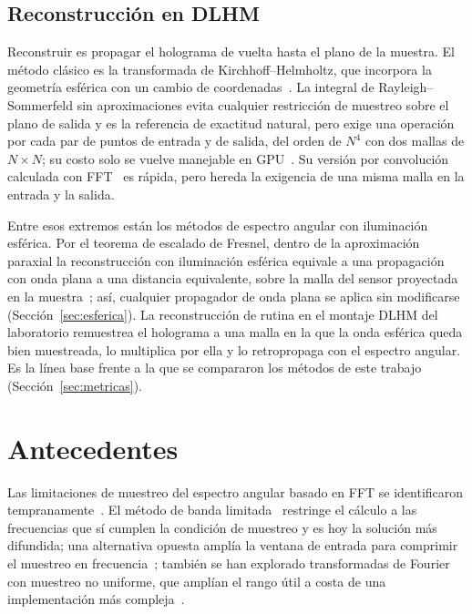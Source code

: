 \subsection{Reconstrucción en DLHM}
\label{sec:reconstruccion-dlhm}

Reconstruir es propagar el holograma de vuelta hasta el plano de la muestra.
El método clásico es la transformada de Kirchhoff--Helmholtz, que incorpora la
geometría esférica con un cambio de coordenadas~\cite{kreuzer2001}. La
integral de Rayleigh--Sommerfeld sin aproximaciones evita cualquier
restricción de muestreo sobre el plano de salida y es la referencia de
exactitud natural, pero exige una operación por cada par de puntos de entrada
y de salida, del orden de $N^4$ con dos mallas de $N\times N$; su costo solo se
vuelve manejable en GPU~\cite{buitrago2019}. Su versión por convolución calculada con
FFT~\cite{shen2006} es rápida, pero hereda la exigencia de una misma malla en
la entrada y la salida.

Entre esos extremos están los métodos de espectro angular con iluminación
esférica. Por el teorema de escalado de Fresnel, dentro de la aproximación
paraxial la reconstrucción con iluminación esférica equivale a una
propagación con onda plana a una distancia equivalente, sobre la malla del
sensor proyectada en la muestra~\cite{latychevskaia2015}; así, cualquier
propagador de onda plana se aplica sin modificarse
(Sección~\ref{sec:esferica}). La reconstrucción de rutina en el montaje DLHM
del laboratorio remuestrea el holograma a una malla en la que la onda esférica
queda bien muestreada, lo multiplica por ella y lo retropropaga con el espectro
angular. Es la línea base frente a la que se compararon los métodos de este
trabajo (Sección~\ref{sec:metricas}).

\section{Antecedentes}
\label{sec:antecedentes}

Las limitaciones de muestreo del espectro angular basado en FFT se
identificaron tempranamente~\cite{li2007}. El método de banda
limitada~\cite{matsushima2009} restringe el cálculo a las frecuencias que sí
cumplen la condición de muestreo y es hoy la solución más difundida; una
alternativa opuesta amplía la ventana de entrada para comprimir el muestreo
en frecuencia~\cite{yu2012}; también se han explorado transformadas de
Fourier con muestreo no uniforme, que amplían el rango útil a costa de una
implementación más compleja~\cite{kim2014}.

